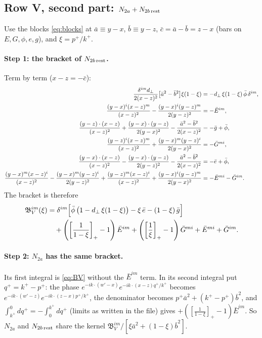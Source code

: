 \documentclass[10pt]{article}
\numberwithin{equation}{section}
\begin{document}
\subsection{Row V, second part: $N_{2a}+N_{2b\,\rm rest}$}
Use the blocks \eqref{eq:blocks} at $\bar a\equiv y-x$, $\bar b\equiv y-z$, $\bar c=\bar a-\bar b=z-x$ (bars on $E,G,\phi,e,g$), and $\xi=p^{+}/k^{+}$.

\paragraph{Step 1: the bracket of $N_{2b\,\rm rest}$.} Term by term ($x-z=-\bar c$):
\begin{align}
\frac{\delta^{im}d_{\perp}}{2(x-z)^{2}}\big[\bar a^{2}-\bar b^{2}\big]\xi(1-\xi)&=-d_{\perp}\,\xi(1-\xi)\,\bar\phi\,\delta^{im},\notag\\
\frac{(y-x)^{i}(x-z)^{m}}{(x-z)^{2}}-\frac{(y-x)^{i}(y-z)^{m}}{2(y-z)^{2}}&=-\bar E^{im},\notag\\
\frac{(y-z)\cdot(x-z)}{(x-z)^{2}}+\frac{(y-x)\cdot(y-z)}{2(y-x)^{2}}-\frac{\bar a^{2}-\bar b^{2}}{2(x-z)^{2}}&=-\bar g+\bar\phi,\notag\\
\frac{(y-z)^{i}(x-z)^{m}}{(x-z)^{2}}+\frac{(y-x)^{m}(y-z)^{i}}{2(y-x)^{2}}&=-\bar G^{mi},\notag\\
\frac{(y-x)\cdot(x-z)}{(x-z)^{2}}-\frac{(y-x)\cdot(y-z)}{2(y-z)^{2}}-\frac{\bar a^{2}-\bar b^{2}}{2(x-z)^{2}}&=-\bar e+\bar\phi,\notag\\
\frac{(y-x)^{m}(x-z)^{i}}{(x-z)^{2}}-\frac{(y-x)^{m}(y-z)^{i}}{2(y-z)^{2}}+\frac{(y-z)^{m}(x-z)^{i}}{(x-z)^{2}}+\frac{(y-x)^{i}(y-z)^{m}}{2(y-x)^{2}}&=-\bar E^{mi}-\bar G^{im}.
\end{align}
The bracket is therefore
\begin{align}
\mathfrak{B}_{V}^{im}(\xi)&=\delta^{im}\Big[\bar\phi\,\big(1-d_{\perp}\,\xi(1-\xi)\big)-\xi\,\bar e-(1-\xi)\,\bar g\Big]\notag\\
&\quad+\left(\left[\frac{1}{1-\xi}\right]_{+}-1\right)\bar E^{im}+\left(\left[\frac{1}{\xi}\right]_{+}-1\right)\bar G^{mi}+\bar E^{mi}+\bar G^{im}. \label{eq:BV}
\end{align}

\paragraph{Step 2: $N_{2a}$ has the same bracket.} Its first integral is \eqref{eq:BV} without the $\bar E^{im}$ term. In its second integral put $q^{+}=k^{+}-p^{+}$: the phase $e^{-ik\cdot(w'-x)}e^{-ik\cdot(x-z)q^{+}/k^{+}}$ becomes $e^{-ik\cdot(w'-z)}e^{-ik\cdot(z-x)p^{+}/k^{+}}$, the denominator becomes $p^{+}\bar a^{2}+(k^{+}-p^{+})\bar b^{2}$, and $\int^{0}_{k^{+}}dq^{+}=-\int_{0}^{k^{+}}dq^{+}$ (limits as written in the file) gives $+([\tfrac{1}{1-\xi}]_{+}-1)\bar E^{im}$. So $N_{2a}$ and $N_{2b\,\rm rest}$ share the kernel $\mathfrak{B}_{V}^{im}/[\xi\bar a^{2}+(1-\xi)\bar b^{2}]$.
\end{document}
